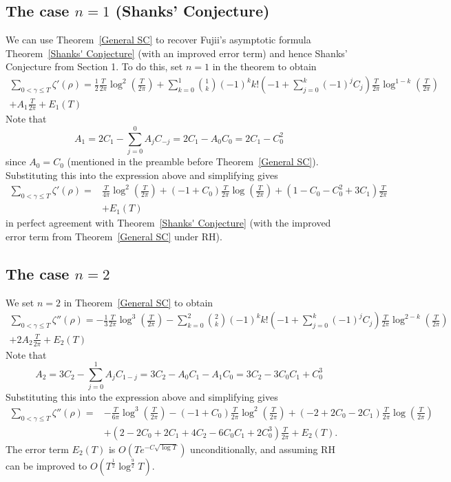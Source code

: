 \documentclass[12pt,a4paper,reqno]{amsart}
\theoremstyle{remark}
\numberwithin{equation}{section}
\begin{document}
\subsection{The case $n=1$ (Shanks' Conjecture)}
We can use Theorem~\ref{General SC} to recover Fujii's asymptotic formula Theorem~\ref{Shanks' Conjecture} (with an improved error term) and hence  Shanks' Conjecture from Section 1. To do this, set $n=1$ in the theorem to obtain
\begin{multline*}
\sum_{0 < \gamma \leq T} \zeta'(\rho) =
 \frac{1}{2} \frac{T}{2 \pi} \log^{2} \left( \frac{T}{2 \pi} \right) + \sum_{k=0}^1 \binom{1}{k}  (-1)^ {k}  k!  \left(-1 + \sum_{j=0}^k (-1)^j C_j \right) \frac{T}{2 \pi} \log^{1-k} \left( \frac{T}{2 \pi} \right) \\
+ A_1 \frac{T}{2 \pi} + E_1(T)
\end{multline*}
Note that
\[
A_1 = 2C_1 - \sum_{j=0}^{0} A_j C_{-j} = 2C_1 -A_0C_0 = 2C_1 - C_0^2
\]
since $A_0=C_0$ (mentioned in the preamble before Theorem~\ref{General SC}). Substituting this into the expression above and simplifying gives
\begin{align*}
\sum_{0 < \gamma \leq T} \zeta' (\rho) =
& \frac{T}{4 \pi} \log^{2} \left( \frac{T}{2 \pi} \right) +(-1 +C_0)\frac{T}{2\pi} \log \left(\frac{T}{2\pi} \right)  + (1-C_0 -C_0^2 +3 C_1)\frac{T}{2 \pi}  \\
& + E_1(T)
\end{align*}
in perfect agreement with Theorem~\ref{Shanks' Conjecture} (with the improved error term from Theorem~\ref{General SC} under RH).


\subsection{The case $n=2$}
We set $n=2$ in Theorem~\ref{General SC} to obtain
\begin{multline*}
\sum_{0 < \gamma \leq T} \zeta''(\rho) =
 - \frac{1}{3} \frac{T}{2 \pi} \log^{3} \left( \frac{T}{2 \pi} \right) - \sum_{k=0}^2 \binom{2}{k}  (-1)^ {k}  k!  \left(-1 + \sum_{j=0}^k (-1)^j C_j \right) \frac{T}{2 \pi} \log^{2-k} \left( \frac{T}{2 \pi} \right) \\
 + 2 A_2  \frac{T}{2 \pi}+ E_2(T)
\end{multline*}
Note that
\[
A_2 = 3C_2 - \sum_{j=0}^{1} A_j C_{1-j} = 3C_2 - A_0C_1 - A_1C_0 = 3C_2 - 3C_0 C_1 + C_0^3
\]
Substituting this into the expression above and simplifying gives
\begin{align*}
\sum_{0 < \gamma \leq T} \zeta'' (\rho) =
& - \frac{T}{6 \pi} \log^{3} \left( \frac{T}{2 \pi} \right) -  (-1 +C_0)\frac{T}{2\pi} \log^2 \left(\frac{T}{2\pi} \right) +   (-2+2C_0 -2C_1) \frac{T}{2 \pi}\log \left(\frac{T}{2\pi} \right) \\
&+ (2-2C_0+2C_1+4C_2-6C_0C_1+2C_0^3)\frac{T}{2\pi}  + E_2(T).
\end{align*}
The error term $E_2(T)$ is $O\left(T e^{-C \sqrt{\log T}}\right)$ unconditionally, and assuming RH can be improved to $O(T^{\frac{1}{2}} \log ^{\frac{9}{2}} T)$.
\end{document}
